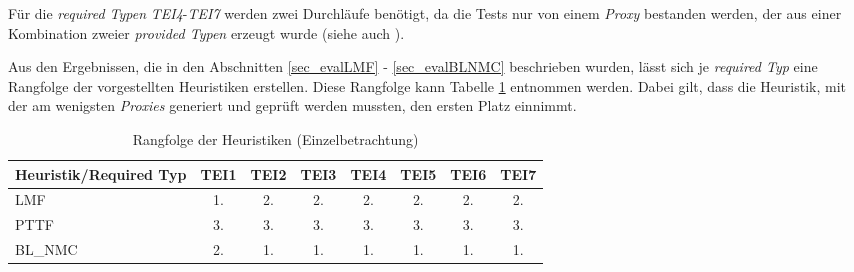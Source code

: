 \begin{multicols}{2}
\columnbreak
{}
\end{multicols}
\begin{multicols}{2}
\columnbreak
{}
\end{multicols}
\pagebreak
\begin{multicols}{2}
\columnbreak
{}
\end{multicols}
\noindent
Für die \emph{required Typen} \emph{TEI4}-\emph{TEI7} werden zwei Durchläufe benötigt, da die Tests nur von einem \emph{Proxy} bestanden werden, der aus einer Kombination zweier \emph{provided Typen} erzeugt wurde (siehe auch ).





Aus den Ergebnissen, die in den Abschnitten \ref{sec_evalLMF} - \ref{sec_evalBLNMC} beschrieben wurden, lässt sich je \emph{required Typ} eine Rangfolge der vorgestellten \Gls{Heuristik}en erstellen. Diese Rangfolge kann Tabelle \ref{tab_rankingSingle} entnommen werden. Dabei gilt, dass die \Gls{Heuristik}, mit der am wenigsten \emph{Proxies} generiert und geprüft werden mussten, den ersten Platz einnimmt. 
\begin{table}[!h]
\centering
\begin{tabular}{|l|c|c|c|c|c|c|c|}
\hline
\hline
\textbf{Heuristik/Required Typ} & \textbf{TEI1} & \textbf{TEI2}& \textbf{TEI3}& \textbf{TEI4}& \textbf{TEI5}& \textbf{TEI6}& \textbf{TEI7}\\
\hline
\hline
LMF  &1.&2.&2.&2.&2.&2.&2.\\
\hline
PTTF  &3. &3.&3.&3.&3.&3.&3. \\
\hline
BL\_NMC & 2. &1. &1. &1. &1.&1.&1.\\
\hline
\hline
\end{tabular}
\caption{Rangfolge der Heuristiken (Einzelbetrachtung)}
\label{tab_rankingSingle}
\end{table}

\pagebreak
